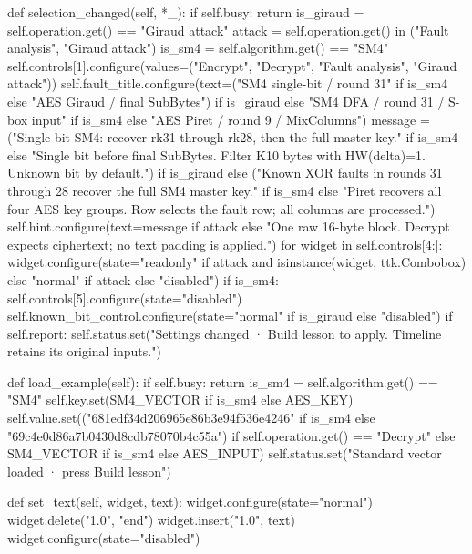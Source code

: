 \begin{lightcode}[numbers=left,firstnumber=1]
    def selection_changed(self, *_):
        if self.busy:
            return
        is_giraud = self.operation.get() == "Giraud attack"
        attack = self.operation.get() in ("Fault analysis", "Giraud attack")
        is_sm4 = self.algorithm.get() == "SM4"
        self.controls[1].configure(values=("Encrypt", "Decrypt", "Fault analysis", "Giraud attack"))
        self.fault_title.configure(text=("SM4 single-bit / round 31" if is_sm4 else "AES Giraud / final SubBytes") if is_giraud else "SM4 DFA / round 31 / S-box input" if is_sm4 else "AES Piret / round 9 / MixColumns")
        message = ("Single-bit SM4: recover rk31 through rk28, then the full master key." if is_sm4 else "Single bit before final SubBytes. Filter K10 bytes with HW(delta)=1. Unknown bit by default.") if is_giraud else ("Known XOR faults in rounds 31 through 28 recover the full SM4 master key." if is_sm4 else "Piret recovers all four AES key groups. Row selects the fault row; all columns are processed.")
        self.hint.configure(text=message if attack else "One raw 16-byte block. Decrypt expects ciphertext; no text padding is applied.")
        for widget in self.controls[4:]:
            widget.configure(state="readonly" if attack and isinstance(widget, ttk.Combobox) else "normal" if attack else "disabled")
        if is_sm4:
            self.controls[5].configure(state="disabled")
        self.known_bit_control.configure(state="normal" if is_giraud else "disabled")
        if self.report:
            self.status.set("Settings changed · Build lesson to apply. Timeline retains its original inputs.")

    def load_example(self):
        if self.busy:
            return
        is_sm4 = self.algorithm.get() == "SM4"
        self.key.set(SM4_VECTOR if is_sm4 else AES_KEY)
        self.value.set(("681edf34d206965e86b3e94f536e4246" if is_sm4 else "69c4e0d86a7b0430d8cdb78070b4c55a") if self.operation.get() == "Decrypt" else SM4_VECTOR if is_sm4 else AES_INPUT)
        self.status.set("Standard vector loaded · press Build lesson")

    def set_text(self, widget, text):
        widget.configure(state="normal")
        widget.delete("1.0", "end")
        widget.insert("1.0", text)
        widget.configure(state="disabled")


\end{lightcode}
